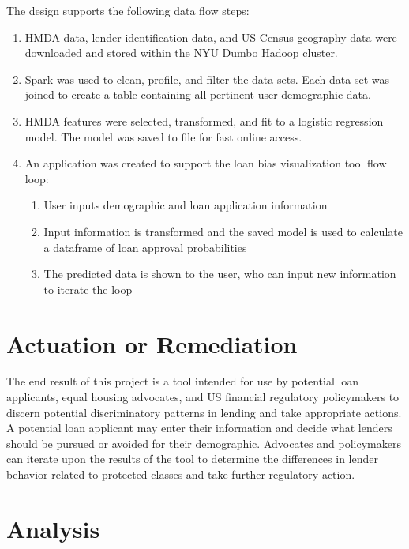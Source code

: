 \documentclass[conference,compsoc]{IEEEtran}
\begin{document}
The design supports the following data flow steps:
\begin{enumerate}

\item HMDA data, lender identification data, and US Census geography data were downloaded and stored within the NYU Dumbo Hadoop cluster.

\item Spark was used to clean, profile, and filter the data sets. Each data set was joined to create a table containing all pertinent user demographic data.

\item HMDA features were selected, transformed, and fit to a logistic regression model. The model was saved to file for fast online access.

\item An application was created to support the loan bias visualization tool flow loop:

\begin{enumerate}
\item User inputs demographic and loan application information
\item Input information is transformed and the saved model is used to calculate a dataframe of loan approval probabilities
\item The predicted data is shown to the user, who can input new information to iterate the loop
\end{enumerate}

\end{enumerate}


\section{Actuation or Remediation}

 The end result of this project is a tool intended for use by potential loan applicants, equal housing advocates, and US financial regulatory policymakers to discern potential discriminatory patterns in lending and take appropriate actions. A potential loan applicant may enter their information and decide what lenders should be pursued or avoided for their demographic. Advocates and policymakers can iterate upon the results of the tool to determine the differences in lender behavior related to protected classes and take further regulatory action.

\section{Analysis}
\end{document}
